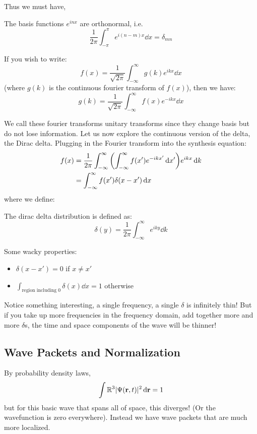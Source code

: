 Thus we must have,
\begin{theorem}
    The basis functions $e^{inx}$ are orthonormal, i.e.
    \[ \frac{1}{2\pi} \int_{-\pi}^{\pi} e^{i(n - m) x} \dd{x} = \delta_{mn} \]
\end{theorem}

\begin{theorem}
    If you wish to write:
    \[ f(x) = \frac{1}{\sqrt{2 \pi}} \int_{-\infty}^{\infty} g(k) e^{i kx} \dd{x} \]
    (where $g(k)$ is the continuous fourier transform of $f(x)$), then we have:
    \[ g(k) = \frac{1}{\sqrt{2 \pi}} \int_{-\infty}^{\infty} f(x) e^{-ikx} \dd{x} \]
\end{theorem}

We call these fourier transforms unitary transforms since they change basis but do not lose information.
Let us now explore the continuous version of the delta, the Dirac delta. Plugging in the Fourier transform into the synthesis equation:
\begin{align*}
    f(x) &= \frac{1}{2 \pi} \int_{-\infty}^{\infty} \qty(\int_{-\infty}^{\infty} f(x') e^{-ikx'} \dd{x'}) e^{ikx} \dd{k} \\
    &= \int_{-\infty}^{\infty} f(x') \delta(x - x') \dd{x}
\end{align*}
where we define:
\begin{definition}
    The dirac delta distribution is defined as:
    \[ \delta(y) = \frac{1}{2\pi} \int_{-\infty}^{\infty} e^{iky} \dd{k} \]
\end{definition}
Some wacky properties:
\begin{itemize}
    \item $\delta(x - x') = 0$ if $x \neq x'$
    \item $\int_{\text{region including }0} \delta(x) \dd{x} = 1$ otherwise
\end{itemize}
Notice something interesting, a single frequency, a single $\delta$ is infinitely thin! But if you take up more frequencies in the frequency domain, add together more and more $\delta$s,
the time and space components of the wave will be thinner!

\subsection{Wave Packets and Normalization}
By probability density laws,
\[ \int{\mathbb{R}^3} |\Psi(\mathbf{r}, t)|^2 \dd{\mathbf{r}} = 1 \]
but for this basic wave that spans all of space, this diverges! (Or the wavefunction is zero everywhere). Instead we have
wave packets that are much more localized.

